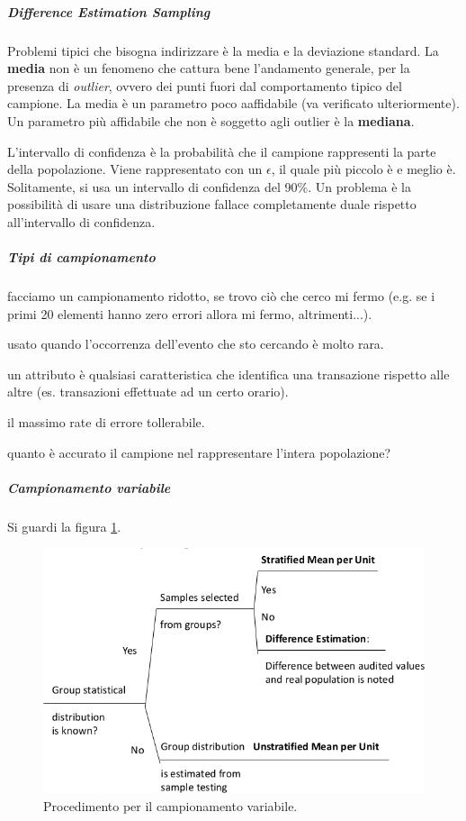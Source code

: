 \subparagraph*{Difference Estimation Sampling}

Problemi tipici che bisogna indirizzare è la media e la deviazione standard.
La \textbf{media} non è un fenomeno che cattura bene l'andamento generale, per la
presenza di \textit{outlier}, ovvero dei punti fuori dal comportamento 
tipico del campione.
La media è un parametro poco aaffidabile (va verificato
ulteriormente). Un parametro più affidabile che non è soggetto agli
outlier è la \textbf{mediana}.

L'intervallo di confidenza è la probabilità che il campione rappresenti la parte
della popolazione. Viene rappresentato con un $\epsilon$, il quale più piccolo è e
meglio è. Solitamente, si usa un intervallo di confidenza del 90\%. Un problema
è la possibilità di usare una distribuzione fallace completamente duale rispetto
all'intervallo di confidenza.


\subparagraph*{Tipi di campionamento}

 facciamo un campionamento ridotto, se trovo 
ciò che cerco mi fermo (e.g. se i primi 20 elementi hanno zero errori allora mi fermo, 
altrimenti...).

 usato quando l'occorrenza dell'evento che
sto cercando è molto rara.

 un attributo è qualsiasi
caratteristica che identifica una transazione rispetto alle altre (es.
transazioni effettuate ad un certo orario).

 il massimo rate di errore
tollerabile.

 quanto è accurato il campione nel rappresentare
l'intera popolazione?


\subparagraph{Campionamento variabile}

Si guardi la figura \ref{fig:variable:sampling}.

\begin{figure}[h!]
        \begin{center}
                \includegraphics[scale=0.45]{res/img/variable_sampling.png}
        \end{center}
        \caption{Procedimento per il campionamento variabile.}
        \label{fig:variable:sampling}
\end{figure}

